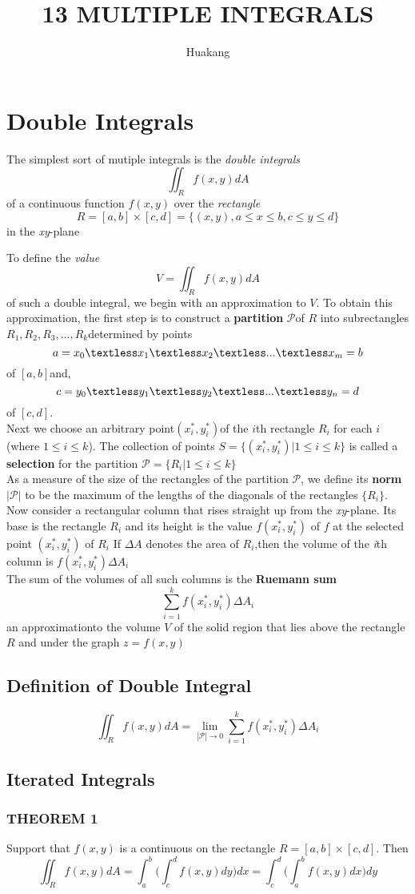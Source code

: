 \documentclass{article}
\title{13 MULTIPLE INTEGRALS}
\author{Huakang}
\begin{document}
    \maketitle
    \section{Double Integrals}
    The simplest sort of mutiple integrals is the \textit{double integrals}
    $$\iint _R f(x,y)dA$$
    of a continuous function $f(x,y)$ over the \textit{rectangle}
    $$R=[a,b]\times[c,d]=\{(x,y),a\leq x\leq b,c\leq y\leq d\}$$
    in the \textit{xy}-plane

    To define the \textit{value}
    $$V=\iint_R f(x,y)dA$$
    of such a double integral, we begin with an approximation to $V$. 
    To obtain this approximation, the first step is to construct a 
    \textbf{partition} $\mathcal{P}$of $R$ into subrectangles 
    $R_1,R_2,R_3,...,R_k$determined by points
    $$a=x_0\textless x_1 \textless x_2 \textless ... \textless x_m=b $$of $[a,b]$and,
    $$c=y_0\textless y_1 \textless y_2 \textless ... \textless y_n=d $$of $[c,d]$.
    \\ Next we choose an arbitrary point$(x_i ^*,y_i^*)$of the $i$th rectangle $R_i$
    for each $i$(where $1\leq i \leq k$). The collection of points $S=\{(x_i ^*,y_i^*)|1\leq i \leq k\}$
    is called a \textbf{selection} for the partition $\mathcal{P}=\{R_i|1\leq i \leq k\}$
    \\As a measure of the size of the rectangles of the partition $\mathcal{P}$, we define its \textbf{norm} $|\mathcal{P}|$ to be the maximum of the lengths of the diagonals of the rectangles $\{R_i\}$.
    \\Now consider a rectangular column that rises straight up from the \textit{xy}-plane. Its base is the rectangle $R_i$ and its height is the value $f(x_i^*,y_i^*)$
    of $f$ at the selected point $(x_i^*,y_i^*)$ of $R_i$ If $\Delta A$ denotes the area of $R_i$,then the volume of the  \textit{i}th column is $f(x_i^*,y_i^*) \Delta A_i$
    \\The sum of the volumes of all such columns is the \textbf{Ruemann sum}
    $$\sum _{i=1} ^k f(x_i^*,y_i^*)\Delta A_i$$
    an approximationto the volume $V$ of the solid region that lies above the rectangle $R$ and under the graph $z=f(x,y)$
    
    \subsection{Definition of Double Integral}
    $$\iint _R f(x,y)dA=\lim _{|\mathcal{P}|\rightarrow 0 }\sum _{i=1} ^k f(x_i^*,y_i^*) \Delta A_i$$


    \subsection{Iterated Integrals}
    \subsubsection{THEOREM 1}
    Support that $f(x,y)$ is a continuous on the rectangle $R=[a,b]\times [c,d]$. Then
    $$\iint _R f(x,y)d A=\int_a^b \bigg(\int_c^df(x,y)dy\bigg) dx=\int_c^d \bigg(\int_a^bf(x,y)dx\bigg) dy$$
\end{document}
